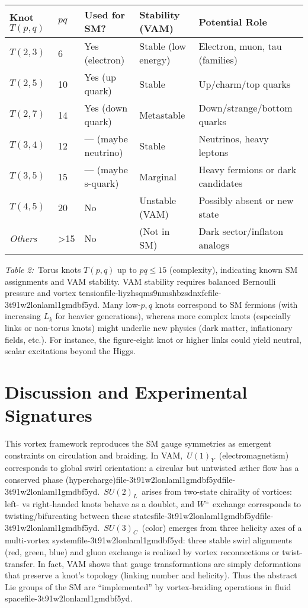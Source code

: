 \documentclass[a4paper,12pt]{article}
\begin{document}
\begin{table}
    \centering
    \begin{tabular}{lllll}
        \toprule
        \textbf{Knot $T(p,q)$} & \textbf{$pq$} & \textbf{Used for SM?} & \textbf{Stability (VAM)} & \textbf{Potential Role} \\
        \midrule
        $T(2,3)$ & 6 & Yes (electron) & Stable (low energy) & Electron, muon, tau (families) \\
        $T(2,5)$ & 10 & Yes (up quark) & Stable & Up/charm/top quarks \\
        $T(2,7)$ & 14 & Yes (down quark) & Metastable & Down/strange/bottom quarks \\
        $T(3,4)$ & 12 & — (maybe neutrino) & Stable & Neutrinos, heavy leptons \\
        $T(3,5)$ & 15 & — (maybe s-quark) & Marginal & Heavy fermions or dark candidates \\
        $T(4,5)$ & 20 & No & Unstable (VAM) & Possibly absent or new state \\
        \textit{Others} & >15 & No & (Not in SM) & Dark sector/inflaton analogs \\
        \bottomrule
    \end{tabular}
    \caption{}
    \label{tab:}
\end{table}



\textit{Table 2:} Torus knots $T(p,q)$ up to $pq\le15$ (complexity), indicating known SM assignments and VAM stability. VAM stability requires balanced Bernoulli pressure and vortex tensionfile-liyzhsqms9nmshbzsdnxfcfile-3t91w2lonlaml1gmdbf5yd. Many low-$p,q$ knots correspond to SM fermions (with increasing $L_k$ for heavier generations), whereas more complex knots (especially links or non-torus knots) might underlie new physics (dark matter, inflationary fields, etc.). For instance, the figure-eight knot or higher links could yield neutral, scalar excitations beyond the Higgs.

\section*{Discussion and Experimental Signatures}
This vortex framework reproduces the SM gauge symmetries as emergent constraints on circulation and braiding. In VAM, $U(1)_Y$ (electromagnetism) corresponds to global swirl orientation: a circular but untwisted æther flow has a conserved phase (hypercharge)file-3t91w2lonlaml1gmdbf5ydfile-3t91w2lonlaml1gmdbf5yd. $SU(2)_L$ arises from two-state chirality of vortices: left- vs right-handed knots behave as a doublet, and $W^\pm$ exchange corresponds to twisting/bifurcating between these statesfile-3t91w2lonlaml1gmdbf5ydfile-3t91w2lonlaml1gmdbf5yd. $SU(3)_C$ (color) emerges from three helicity axes of a multi-vortex systemfile-3t91w2lonlaml1gmdbf5yd: three stable swirl alignments (red, green, blue) and gluon exchange is realized by vortex reconnections or twist-transfer. In fact, VAM shows that gauge transformations are simply deformations that preserve a knot’s topology (linking number and helicity). Thus the abstract Lie groups of the SM are “implemented” by vortex-braiding operations in fluid spacefile-3t91w2lonlaml1gmdbf5yd.
\end{document}
